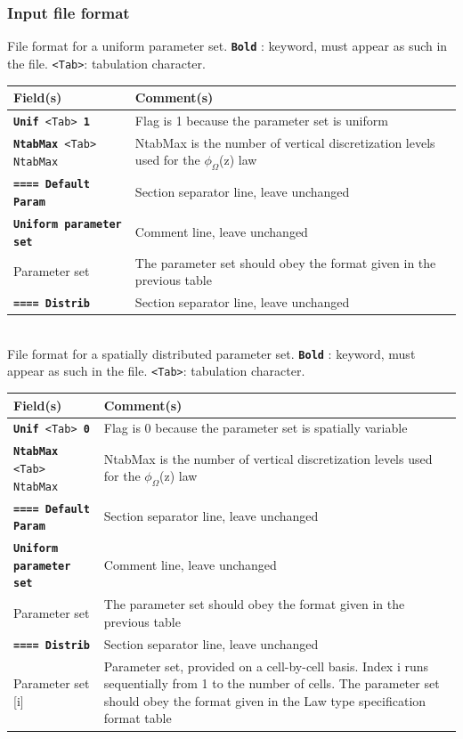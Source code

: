 \subsubsection{Input file format}
%
File format for a uniform parameter set.  \texttt{\textbf{Bold}} : keyword, must appear as such in the file. \texttt{<Tab>}: tabulation character. \\
    \begin{tabular}{p{6cm} | p{9cm}}
    \hline
    Field(s) & Comment(s) \\
    \hline  \hline
    \texttt{\textbf{Unif} <Tab> \textbf{1}} & Flag is 1 because the parameter set is uniform \\ \hline
    \texttt{\textbf{NtabMax} <Tab> NtabMax} & NtabMax is the number of vertical discretization levels used for the $\phi_\Omega$(z) law \\ \hline
    \texttt{\textbf{==== Default Param}} & Section separator line, leave unchanged \\  \hline
    \texttt{\textbf{Uniform parameter set}} & Comment line, leave unchanged \\  \hline
    Parameter set     & The parameter set should obey the format given in the previous table \\ \hline
    \texttt{\textbf{==== Distrib}} & Section separator line, leave unchanged \\  \hline
    \end{tabular}
%
\vspace{10mm} \\
%
File format for a spatially distributed parameter set.  \texttt{\textbf{Bold}} : keyword, must appear as such in the file. \texttt{<Tab>}: tabulation character. \\
    \begin{tabular}{p{6cm} | p{9cm}}
    \hline
    Field(s) & Comment(s) \\
    \hline  \hline
    \texttt{\textbf{Unif} <Tab> \textbf{0}} & Flag is 0 because the parameter set is spatially variable \\ \hline
    \texttt{\textbf{NtabMax} <Tab> NtabMax} & NtabMax is the number of vertical discretization levels used for the $\phi_\Omega$(z) law \\ \hline
    \texttt{\textbf{==== Default Param}} & Section separator line, leave unchanged \\  \hline
    \texttt{\textbf{Uniform parameter set}} & Comment line, leave unchanged \\  \hline
    Parameter set     & The parameter set should obey the format given in the previous table \\ \hline
    \texttt{\textbf{==== Distrib}} & Section separator line, leave unchanged \\  \hline
    Parameter set [i]     & Parameter set, provided on a cell-by-cell basis. Index i runs sequentially from 1 to the number of cells. The parameter set should obey the format given in the Law type specification format table \\ \hline
    \end{tabular}
%
